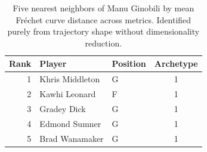 \begin{table}[htbp]
  \centering\small
  \begin{tabular}{rllc}
    \toprule
    Rank & Player & Position & Archetype \\
    \midrule
    1 & Khris Middleton & G & 1 \\
    2 & Kawhi Leonard & F & 1 \\
    3 & Gradey Dick & G & 1 \\
    4 & Edmond Sumner & G & 1 \\
    5 & Brad Wanamaker & G & 1 \\
    \bottomrule
  \end{tabular}
  \caption{Five nearest neighbors of Manu Ginobili by mean Fr\'{e}chet curve distance across metrics. Identified purely from trajectory shape without dimensionality reduction.}
  \label{tab:Manu_Ginobili_frechet_curve_neighbors}
\end{table}

